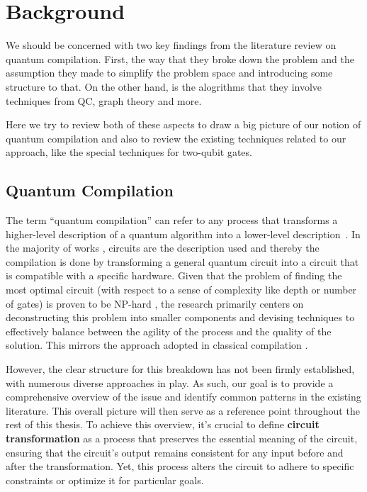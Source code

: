 \chapter{Background}\label{chap:background}

We should be concerned with two key findings from the literature review on quantum compilation. First, the way that they broke down the problem and the assumption they made to simplify the problem space and introducing some structure to that. On the other hand, is the alogrithms that they involve techniques from QC, graph theory and more.

Here we try to review both of these aspects to draw a big picture of our notion of quantum compilation and also to review the existing techniques related to our approach, like the special techniques for two-qubit gates.

\section{Quantum Compilation}
The term ``quantum compilation'' can refer to any process that transforms a higher-level description of a quantum algorithm into a lower-level description~\cite{hundt2022}. In the majority of works \cite{zulehner2018,childs,cross2022,sivarajah2021,qiskit2023,paler2021}, circuits are the description used and thereby the compilation is done by transforming a general quantum circuit into a circuit that is compatible with a specific hardware. Given that the problem of finding the most optimal circuit (with respect to a sense of complexity like depth or number of gates) is proven to be NP-hard \cite{siraichi2018}, the research primarily centers on deconstructing this problem into smaller components and devising techniques to effectively balance between the agility of the process and the quality of the solution. This mirrors the approach adopted in classical compilation \cite{allen2001}.

However, the clear structure for this breakdown has not been firmly established, with numerous diverse approaches in play. As such, our goal is to provide a comprehensive overview of the issue and identify common patterns in the existing literature. This overall picture will then serve as a reference point throughout the rest of this thesis. To achieve this overview, it's crucial to define \textbf{circuit transformation} as a process that preserves the essential meaning of the circuit, ensuring that the circuit's output remains consistent for any input before and after the transformation. Yet, this process alters the circuit to adhere to specific constraints or optimize it for particular goals.

